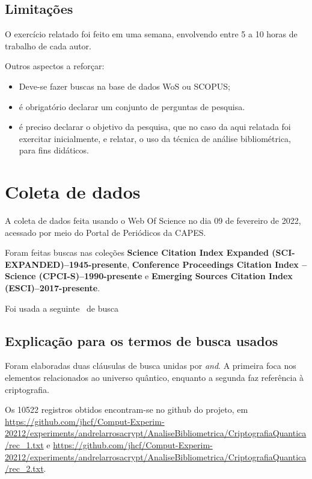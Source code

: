 \subsection{Limitações} O exercício relatado foi feito em uma semana, envolvendo entre 5 a 10 horas de trabalho de cada autor.

Outros aspectos a reforçar:
\begin{itemize}
   
\item Deve-se fazer buscas na base de dados WoS ou SCOPUS;
\item é obrigatório declarar um conjunto de perguntas de pesquisa.
\item é preciso declarar o objetivo da pesquisa, que no caso da aqui relatada foi exercitar inicialmente, e relatar, o uso da técnica de análise bibliométrica, para fins didáticos.
\end{itemize}
%

\section{Coleta de dados}%

A coleta de dados feita usando o Web Of Science  no dia 09 de fevereiro de 2022, acessado por meio do Portal de Periódicos da CAPES.

Foram feitas buscas nas coleções \textbf{Science Citation Index Expanded (SCI-EXPANDED)--1945-presente}, \textbf{Conference Proceedings Citation Index – Science (CPCI-S)--1990-presente} e \textbf{Emerging Sources Citation Index (ESCI)--2017-presente}. 

Foi usada a seguinte \query\  de busca


\subsection{Explicação para os termos de busca usados}%

Foram elaboradas duas cláusulas de busca unidas por \textit{and}. A primeira foca nos elementos relacionados ao universo quântico, enquanto a segunda faz referência à criptografia.


Os 10522 registros obtidos encontram-se no github do projeto, em \url{https://github.com/jhcf/Comput-Experim-20212/experiments/andrelarrosacrypt/AnaliseBibliometrica/CriptografiaQuantica/rec_1.txt} e \url{https://github.com/jhcf/Comput-Experim-20212/experiments/andrelarrosacrypt/AnaliseBibliometrica/CriptografiaQuantica/rec_2.txt}. 

